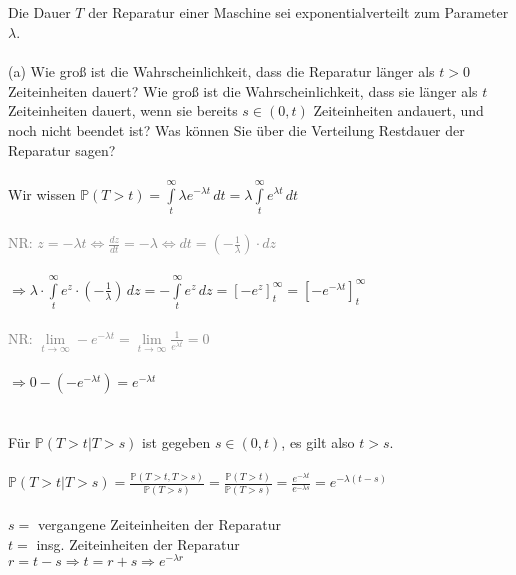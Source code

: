 \documentclass[a4paper]{article}
\begin{document}
\subsection{}
Die Dauer $T$ der Reparatur einer Maschine sei exponentialverteilt zum Parameter $\lambda$.\\\\
(a) Wie groß ist die Wahrscheinlichkeit, dass die Reparatur länger als $t > 0$ Zeiteinheiten dauert? Wie groß ist die Wahrscheinlichkeit, dass sie länger als $t$ Zeiteinheiten dauert, wenn sie bereits $s\in(0,t)$ Zeiteinheiten andauert, und noch nicht beendet ist? Was können Sie über die Verteilung Restdauer der Reparatur sagen?\\\\
Wir wissen \(\mathbb{P}(T>t)=\int\limits^\infty_t \lambda e^{-\lambda t}\, dt = \lambda \int\limits^\infty_t e^{\lambda t}\, dt\)\\\\
\textcolor{gray}{NR: \(z = -\lambda t \Leftrightarrow \frac{dz}{dt} = -\lambda \Leftrightarrow dt = \left(-\frac{1}{\lambda}\right)\cdot dz\)}\\\\
\(\Rightarrow \lambda \cdot \int\limits^\infty_t e^z\cdot\left(-\frac{1}{\lambda}\right)\, dz = -\int\limits^\infty_t e^z\, dz = \left[-e^z\right]^\infty_t = \left[-e^{-\lambda t}\right]^\infty_t\)\\\\
\textcolor{gray}{NR: \(\lim\limits_{t\to\infty} -e^{-\lambda t} = \lim\limits_{t\to\infty} \frac{1}{e^{\lambda t}}=0\)}\\\\
\(\Rightarrow 0 - \left(-e^{-\lambda t}\right)=e^{-\lambda t}\)\\\\\\
Für \(\mathbb{P}(T>t \vert T>s)\) ist gegeben \(s\in (0,t)\), es gilt also \(t>s\).\\\\
\(\mathbb{P}(T>t \vert T>s)=\frac{\mathbb{P}(T>t,T>s)}{\mathbb{P}(T>s)}=\frac{\mathbb{P}(T>t)}{\mathbb{P}(T>s)}=\frac{e^{-\lambda t}}{e^{-\lambda s}}=e^{-\lambda (t-s)}\)\\\\
$s=$ vergangene Zeiteinheiten der Reparatur\\
$t=$ insg. Zeiteinheiten der Reparatur\\
\(r= t-s \Rightarrow t=r+s \Rightarrow e^{-\lambda r}\)\\\\
\end{document}

